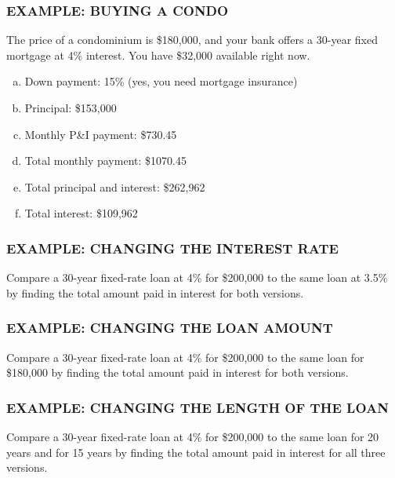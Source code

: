 \documentclass[8pt]{beamer}
\newcommand{\extitle}[1]{\frametitle{\fontfamily{fvs}\selectfont \small\color{black!70!blue!80!cyan}\uppercase{\bfseries Example: #1}}}
\def\solblank{\begin{tcolorbox}[colframe=black!50!blue!50!cyan,
colback=white,
bottomrule=0mm,
rightrule=0mm,
sharp corners=all] 
\vspace{6in}
\text{}
\end{tcolorbox}}
\begin{document}
\begin{frame}
\extitle{Buying a Condo}
The price of a condominium is \$180,000, and your bank offers a 30-year fixed mortgage at 4\% interest.  You have \$32,000 available right now.
\begin{enumerate}[(a)]
\item Down payment: 15\% (yes, you need mortgage insurance)
\item Principal: \$153,000
\item Monthly P\&I payment: \$730.45
\item Total monthly payment: \$1070.45
\item Total principal and interest: \$262,962
\item Total interest: \$109,962
\end{enumerate}
\end{frame}

\begin{frame}
\extitle{Changing the Interest Rate}
Compare a 30-year fixed-rate loan at 4\% for \$200,000 to the same loan at 3.5\% by finding the total amount paid in interest for both versions.

\solblank
\end{frame}

\begin{frame}
\extitle{Changing the Loan Amount}
Compare a 30-year fixed-rate loan at 4\% for \$200,000 to the same loan for \$180,000 by finding the total amount paid in interest for both versions.

\solblank
\end{frame}

\begin{frame}
\extitle{Changing the Length of the Loan}
Compare a 30-year fixed-rate loan at 4\% for \$200,000 to the same loan for 20 years and for 15 years by finding the total amount paid in interest for all three versions.

\solblank
\end{frame}
\end{document}
